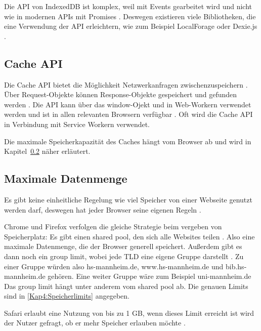 Die \ac{API} von IndexedDB ist komplex, weil mit Events gearbeitet wird und nicht wie in modernen \acp{API} mit Promises \autocite{Hajian2019}. Deswegen existieren viele Bibliotheken, die eine Verwendung der \ac{API} erleichtern, wie zum Beispiel LocalForage oder Dexie.js \autocite{Hajian2019} \autocite{mdn-indexeddb}.

\subsection{Cache API}
Die Cache \ac{API} bietet die Möglichkeit Netzwerkanfragen zwischenzuspeichern \autocite{mdn-cache-api}. Über Request-Objekte können Response-Objekte gespeichert und gefunden werden \autocite{mdn-cache-api}. Die \ac{API} kann über das window-Ojekt und in Web-Workern verwendet werden und ist in allen relevanten Browsern verfügbar \autocite{mdn-cache-api}. Oft wird die Cache \ac{API} in Verbindung mit Service Workern verwendet.

Die maximale Speicherkapazität des Caches hängt vom Browser ab und wird in Kapitel~\ref{Kap4:Datenmenge} näher erläutert. 

\subsection{Maximale Datenmenge}
\label{Kap4:Datenmenge}
Es gibt keine einheitliche Regelung wie viel Speicher von einer Webseite genutzt werden darf, deswegen hat jeder Browser seine eigenen Regeln \autocite{storage-for-the-web}. 

Chrome und Firefox verfolgen die gleiche Strategie beim vergeben von Speicherplatz: Es gibt einen shared pool, den sich alle Websites teilen \autocite{storage-for-the-web} \autocite{mdn-browser-storage-limit}. Also eine maximale Datenmenge, die der Browser generell speichert. Außerdem gibt es dann noch ein group limit, wobei jede \ac{TLD} eine eigene Gruppe darstellt \autocite{mdn-browser-storage-limit}. Zu einer Gruppe würden also hs-mannheim.de, www.hs-mannheim.de und bib.hs-mannheim.de gehören. Eine weiter Gruppe wäre zum Beispiel uni-mannheim.de Das group limit hängt unter anderem vom shared pool ab. Die genauen Limits sind in \autoref{Kap4:Speicherlimits} angegeben.

Safari erlaubt eine Nutzung von bis zu 1 \ac{GB}, wenn dieses Limit erreicht ist wird der Nutzer gefragt, ob er mehr Speicher erlauben möchte \autocite{storage-for-the-web}. 

